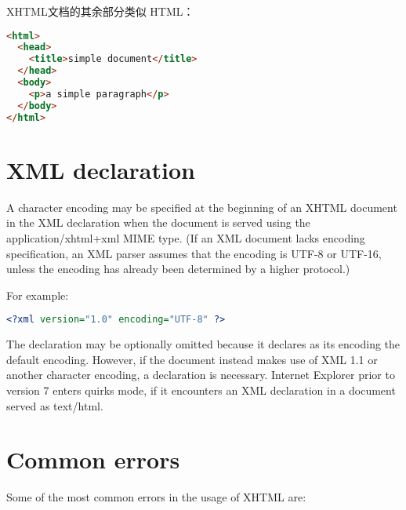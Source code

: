 XHTML文档的其余部分类似 HTML：

\begin{lstlisting}[language=HTML]
<html>
  <head>
    <title>simple document</title>
  </head>
  <body>
    <p>a simple paragraph</p>
  </body>
</html>
\end{lstlisting}




\section{XML declaration}

A character encoding may be specified at the beginning of an XHTML document in the XML declaration when the document is served using the application/xhtml+xml MIME type. (If an XML document lacks encoding specification, an XML parser assumes that the encoding is UTF-8 or UTF-16, unless the encoding has already been determined by a higher protocol.)


For example:

\begin{lstlisting}[language=XML]
	<?xml version="1.0" encoding="UTF-8" ?>
\end{lstlisting}


The declaration may be optionally omitted because it declares as its encoding the default encoding. However, if the document instead makes use of XML 1.1 or another character encoding, a declaration is necessary. Internet Explorer prior to version 7 enters quirks mode, if it encounters an XML declaration in a document served as text/html.


\section{Common errors}

Some of the most common errors in the usage of XHTML are:


